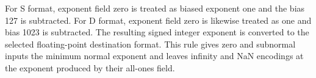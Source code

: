 For S format, exponent field zero is treated as biased exponent one and the bias 127 is subtracted. For D format, exponent field zero is likewise treated as one and bias 1023 is subtracted. The resulting signed integer exponent is converted to the selected floating-point destination format. This rule gives zero and subnormal inputs the minimum normal exponent and leaves infinity and NaN encodings at the exponent produced by their all-ones field.
